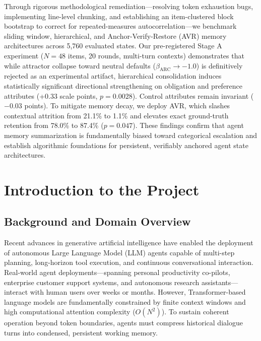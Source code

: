 \documentclass[12pt,a4paper]{report}
\begin{document}
Through rigorous methodological remediation—resolving token exhaustion bugs, implementing line-level chunking, and establishing an item-clustered block bootstrap to correct for repeated-measures autocorrelation—we benchmark sliding window, hierarchical, and Anchor-Verify-Restore (AVR) memory architectures across 5,760 evaluated states. Our pre-registered Stage A experiment ($N=48$ items, 20 rounds, multi-turn contexts) demonstrates that while attractor collapse toward neutral defaults ($\beta_{\text{ARC}} \to -1.0$) is definitively rejected as an experimental artifact, hierarchical consolidation induces statistically significant directional strengthening on obligation and preference attributes (+0.33 scale points, $p=0.0028$). Control attributes remain invariant ($-0.03$ points). To mitigate memory decay, we deploy AVR, which slashes contextual attrition from 21.1\% to 1.1\% and elevates exact ground-truth retention from 78.0\% to 87.4\% ($p=0.047$). These findings confirm that agent memory summarization is fundamentally biased toward categorical escalation and establish algorithmic foundations for persistent, verifiably anchored agent state architectures.

\clearpage

\tableofcontents
\clearpage

\listoftables
{}
\clearpage

\listoffigures
{}
\clearpage

\setcounter{page}{1}

\chapter{Introduction to the Project}

\section{Background and Domain Overview}
Recent advances in generative artificial intelligence have enabled the deployment of autonomous Large Language Model (LLM) agents capable of multi-step planning, long-horizon tool execution, and continuous conversational interaction. Real-world agent deployments—spanning personal productivity co-pilots, enterprise customer support systems, and autonomous research assistants—interact with human users over weeks or months. However, Transformer-based language models are fundamentally constrained by finite context windows and high computational attention complexity ($O(N^2)$). To sustain coherent operation beyond token boundaries, agents must compress historical dialogue turns into condensed, persistent working memory.
\end{document}
